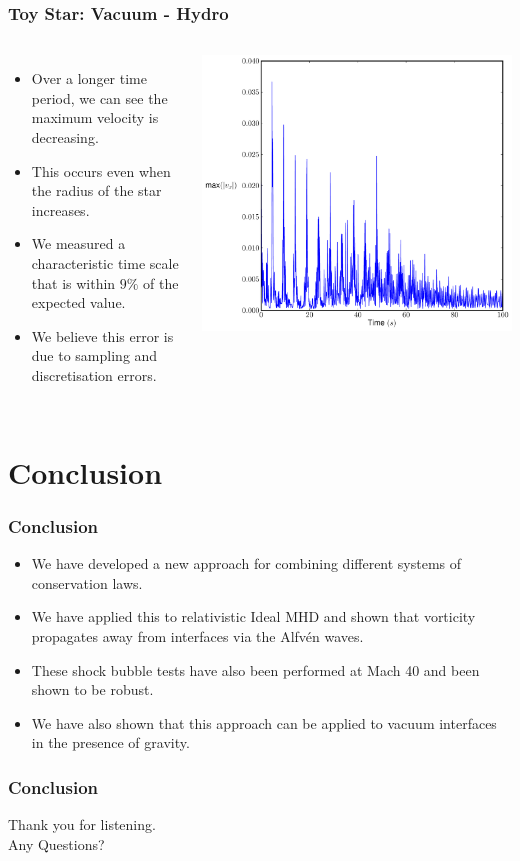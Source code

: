 \documentclass{beamer}
\begin{document}
\begin{frame}
\frametitle{Toy Star: Vacuum - Hydro}
\begin{columns}
\begin{itemize}
\item{Over a longer time period, we can see the maximum velocity is decreasing.}
\item{This occurs even when the radius of the star increases.}
\item{We measured a characteristic time scale that is within $9\%$ of the expected value.}
\item{We believe this error is due to sampling and discretisation errors.}
\end{itemize}
\centering
\includegraphics[width=\textwidth]{../images/toy_max_vx}
\end{columns}
\end{frame}

\section{Conclusion}
\begin{frame}
\frametitle{Conclusion}
\begin{itemize}
\item{We have developed a new approach for combining different systems of conservation laws.}
\item{We have applied this to relativistic Ideal MHD and shown that vorticity propagates away from interfaces via the Alfv\'{e}n waves.}
\item{These shock bubble tests have also been performed at Mach 40 and been shown to be robust.}
\item{We have also shown that this approach can be applied to vacuum interfaces in the presence of gravity.}
\end{itemize}
\end{frame}
\begin{frame}
\frametitle{Conclusion}
\centering
Thank you for listening.\\
Any Questions?
\end{frame}
\end{document}
